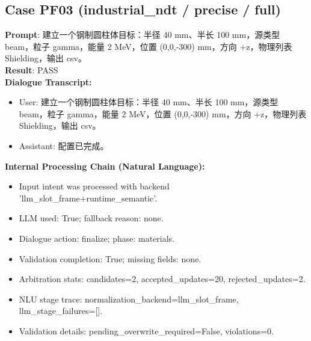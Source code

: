 \documentclass[11pt]{ctexart}
\begin{document}
\subsection{Case PF03 (industrial\_ndt / precise / full)}
\textbf{Prompt}: 建立一个钢制圆柱体目标：半径 40 mm、半长 100 mm，源类型 beam，粒子 gamma，能量 2 MeV，位置 (0,0,-300) mm，方向 +z，物理列表 Shielding，输出 csv。\\
\textbf{Result}: PASS\\
\textbf{Dialogue Transcript:}
\begin{itemize}
\item User: 建立一个钢制圆柱体目标：半径 40 mm、半长 100 mm，源类型 beam，粒子 gamma，能量 2 MeV，位置 (0,0,-300) mm，方向 +z，物理列表 Shielding，输出 csv。
\item Assistant: 配置已完成。
\end{itemize}
\textbf{Internal Processing Chain (Natural Language):}
\begin{itemize}
\item Input intent was processed with backend 'llm\_slot\_frame+runtime\_semantic'.
\item LLM used: True; fallback reason: none.
\item Dialogue action: finalize; phase: materials.
\item Validation completion: True; missing fields: none.
\item Arbitration stats: candidates=2, accepted\_updates=20, rejected\_updates=2.
\item NLU stage trace: normalization\_backend=llm\_slot\_frame, llm\_stage\_failures=[].
\item Validation details: pending\_overwrite\_required=False, violations=0.
\end{itemize}
\end{document}

